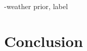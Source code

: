 \documentclass[conference]{IEEEtran}
\begin{document}
-weather prior, label


\section{Conclusion}

\newpage



%
%
%



\end{document}
